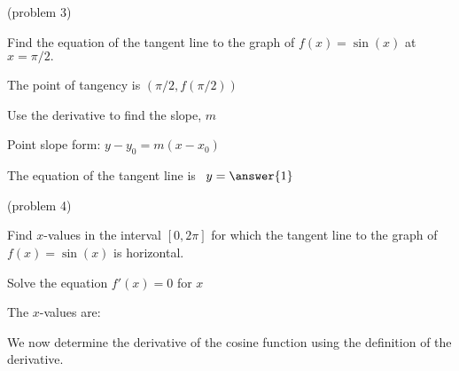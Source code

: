 \documentclass{ximera}
\begin{document}
\begin{problem}(problem 3)

Find the equation of the tangent line to the graph of $f(x) = \sin(x)$ at $x=\pi/2.$

\begin{hint}
The point of tangency is $(\pi/2, f(\pi/2))$
\end{hint}
\begin{hint}
Use the derivative to find the slope, $m$
\end{hint}
\begin{hint}
Point slope form: $y-y_0 = m(x-x_0)$
\end{hint}

The equation of the tangent line is \ $y = \answer{1}$

\end{problem}



\begin{problem}(problem 4)

Find $x$-values in the interval $[0, 2\pi]$ for which the tangent line to the graph of $f(x) = \sin(x)$ is horizontal.


\begin{hint}
Solve the equation $f'(x) = 0$ for $x$
\end{hint}

The $x$-values are:
\begin{multipleChoice}
\end{multipleChoice}

\end{problem}







We now determine the derivative of the cosine function using the definition of the derivative.
\end{document}

